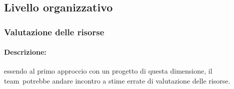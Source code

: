 \documentclass[../PianoProgetto.tex]{subfiles}
\begin{document}
\newpage
\subsection{Livello organizzativo}

\subsubsection{Valutazione delle risorse}
\label{sec:Valutazione delle risorse}

	\paragraph*{Descrizione:} essendo al primo approccio con un progetto di questa dimensione, il team\g\ potrebbe andare incontro a stime errate di valutazione delle risorse.
	
	
\end{document}
